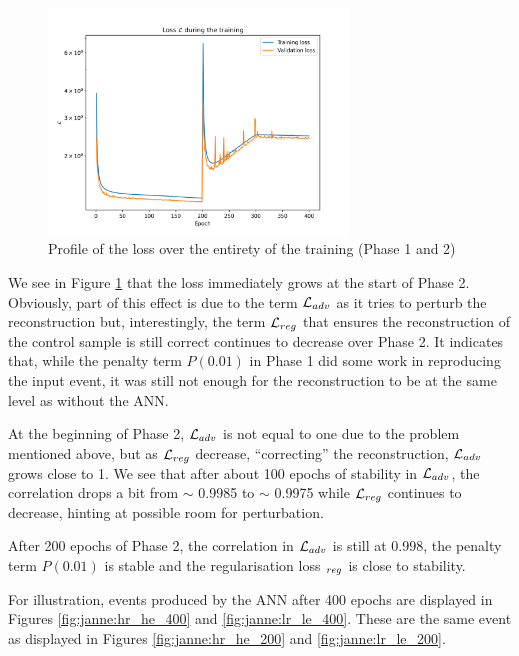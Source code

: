\documentclass[../main.tex]{subfiles}
\begin{document}
\begin{figure}
  \centering
  \includegraphics[height=6cm]{images/janne/training/phase_all_l.png}
  \caption{Profile of the loss over the entirety of the training (Phase 1 and 2)}
  \label{fig:janne:phase_all}
\end{figure}

We see in Figure \ref{fig:janne:phase_all} that the loss immediately grows at the start of Phase 2. Obviously, part of this effect is due to the term ${\cal L}_{adv}$ as it tries to perturb the reconstruction but, interestingly, the term ${\cal L}_{reg}$ that ensures the reconstruction of the control sample is still correct continues to decrease over Phase 2. It indicates that, while the penalty term $P(0.01)$ in Phase 1 did some work in reproducing the input event, it was still not enough for the reconstruction to be at the same level as without the ANN.

At the beginning of Phase 2, ${\cal L}_{adv}$ is not equal to one due to the problem mentioned above, but as ${\cal L}_{reg}$ decrease, ``correcting'' the reconstruction, ${\cal L}_{adv}$ grows close to 1. We see that after about 100 epochs of stability in ${\cal L}_{adv}$, the correlation drops a bit from $\sim$ 0.9985 to $\sim$ 0.9975 while ${\cal L}_{reg}$ continues to decrease, hinting at possible room for perturbation.

After 200 epochs of Phase 2, the correlation in ${\cal L}_{adv}$ is still at 0.998, the penalty term $P(0.01)$ is stable and the regularisation loss ${\cal}_{reg}$ is close to stability.

For illustration, events produced by the ANN after 400 epochs are displayed in Figures \ref{fig:janne:hr_he_400} and \ref{fig:janne:lr_le_400}. These are the same event as displayed in Figures \ref{fig:janne:hr_he_200} and \ref{fig:janne:lr_le_200}.
\end{document}
